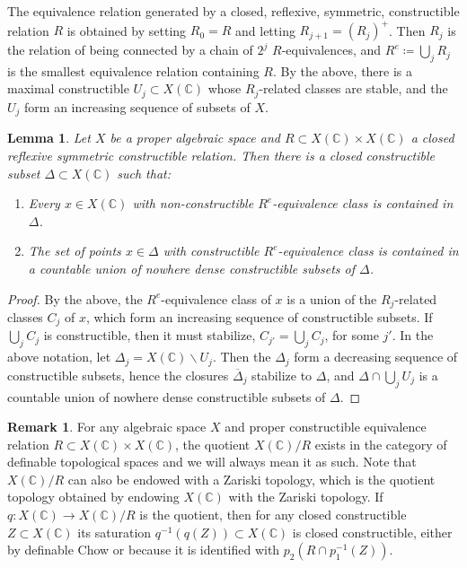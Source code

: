 \documentclass{amsart}
\newcommand{\bs}{\backslash}
\newtheorem{lem}[theorem]{Lemma}
\theoremstyle{definition}
\newtheorem{rem}[theorem]{Remark}
\theoremstyle{remark}
\def\bC{\mathbb{C}}
\numberwithin{equation}{section}
\begin{document}
The equivalence relation generated by a closed, reflexive, symmetric, constructible relation $R$ is obtained by setting $R_0=R$ and letting $R_{j+1}=(R_j)^+$.  Then $R_j$ is the relation of being connected by a chain of $2^j$ $R$-equivalences, and $R^e\coloneqq  \bigcup_j R_j$ is the smallest equivalence relation containing $R$.  By the above, there is a maximal constructible $U_j\subset X(\bC)$ whose $R_j$-related classes are stable, and the $U_j$ form an increasing sequence of subsets of $X$.
\begin{lem}\label{lem:equiv reln}Let $X$ be a proper algebraic space and $R\subset X(\bC)\times X(\bC)$ a closed reflexive symmetric constructible relation.  Then there is a closed constructible subset $\Delta\subset X(\bC)$ such that: 
\begin{enumerate}
\item Every $x\in X(\bC)$ with non-constructible $R^e$-equivalence class is contained in $\Delta$.
\item The set of points $x\in \Delta$ with constructible $R^e$-equivalence class is contained in a countable union of nowhere dense constructible subsets of $\Delta$.
\end{enumerate}

\end{lem}
\begin{proof}By the above, the $R^e$-equivalence class of $x$ is a union of the $R_j$-related classes $C_j$ of $x$, which form an increasing sequence of constructible subsets.  If $\bigcup_j C_j$ is constructible, then it must stabilize, $C_{j'}=\bigcup_j C_j$, for some ${j'}$.  In the above notation, let $\Delta_j=X(\bC)\bs U_j$.  Then the $\Delta_j$ form a decreasing sequence of constructible subsets, hence the closures $\overline \Delta_j$ stabilize to $\Delta$, and $\Delta\cap \bigcup_jU_j$ is a countable union of nowhere dense constructible subsets of $\Delta$. 
\end{proof}

\begin{rem}For any algebraic space $X$ and proper constructible equivalence relation $R\subset X(\bC)\times X(\bC)$, the quotient $X(\bC)/R$ exists in the category of definable topological spaces and we will always mean it as such.  Note that $X(\bC)/R$ can also be endowed with a Zariski topology, which is the quotient topology obtained by endowing $X(\bC)$ with the Zariski topology.  If $q:X(\bC)\to X(\bC)/R$ is the quotient, then for any closed constructible $Z\subset X(\bC)$ its saturation $q^{-1}(q(Z))\subset X(\bC)$ is closed constructible, either by definable Chow or because it is identified with $p_2(R\cap p_1^{-1}(Z))$. 
\end{rem}
\end{document}
